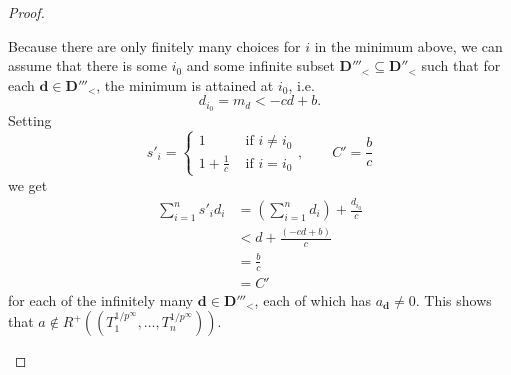 \documentclass[10pt,a4paper]{amsart}
\newcommand{\pRoots}{{1/p^\infty}}
\begin{document}
\begin{proof}
\begin{itemize}
        Because there are only finitely many choices for \(i\) in the minimum above, we can assume that there is some \(i_0\) and some infinite subset \(\mathbf D'''_<\subseteq \mathbf D''_<\) such that for each \(\mathbf d\in \mathbf D'''_<\), the minimum is attained at \(i_0\), i.e. 
        \[d_{i_0}=m_d < -cd+b.\]
        Setting
        \[s'_i=\begin{cases}1 \quad &\text{ if } i\neq i_0\\1+\frac 1c&\text{ if } i=i_0\end{cases}, \qquad C'=\frac bc\]
        we get 
        \begin{align*}
            \sum_{i=1}^n s'_id_i
            &=\left(\sum_{i=1}^n d_i \right)+ \frac{d_{i_0}}c\\
            &< d+\frac{(-cd+b)}c\\
            &=\frac b c \\
            &=C'
        \end{align*}
        for each of the infinitely many \(\mathbf d\in \mathbf{D}'''_<\), each of which has \(a_{\mathbf d}\neq 0\). This shows that \(a\notin R^+((T_1^{\pRoots},\dots, T_n^{\pRoots}))\).
    \end{itemize}
\end{proof}
\end{document}

